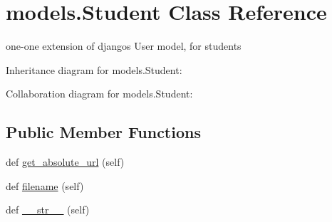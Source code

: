 \hypertarget{classmodels_1_1_student}{}\section{models.\+Student Class Reference}
\label{classmodels_1_1_student}


one-\/one extension of django\textquotesingle{}s User model, for students  




Inheritance diagram for models.\+Student\+:


Collaboration diagram for models.\+Student\+:
\subsection*{Public Member Functions}
\begin{DoxyCompactItemize}
\item 
def \hyperlink{classmodels_1_1_student_a323a8dcc5154ca2766898d9d2a932096}{get\+\_\+absolute\+\_\+url} (self)
\item 
def \hyperlink{classmodels_1_1_student_a06efb83b74bc920a7c5b8dbeabfbc49e}{filename} (self)
\item 
def \hyperlink{classmodels_1_1_student_a872c40f32096518bac452d2dfd24a221}{\+\_\+\+\_\+str\+\_\+\+\_\+} (self)
\end{DoxyCompactItemize}

